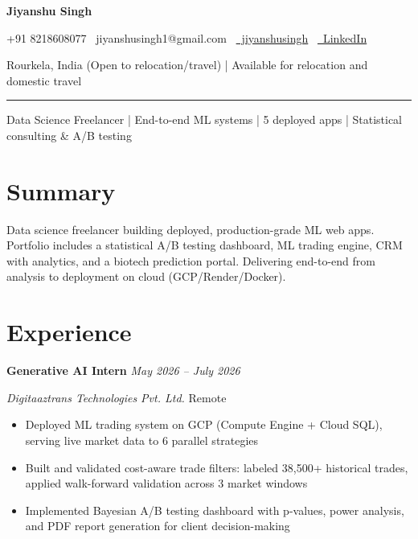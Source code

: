 \documentclass[11pt,a4paper]{article}
\begin{document}
\begin{center}
    {\LARGE \bfseries Jiyanshu Singh}
    
    \vspace{4pt}
    {\small +91 8218608077 \textbullet\ jiyanshusingh1@gmail.com \textbullet\ \href{https://github.com/jiyanshusingh}{\faGithub\ jiyanshusingh} \textbullet\ \href{https://linkedin.com/in/jiyanshusingh}{\faLinkedin\ LinkedIn}}
    
    \vspace{2pt}
    {\footnotesize Rourkela, India (Open to relocation/travel) | Available for relocation and domestic travel}
    
    \rule{\textwidth}{0.4pt}
\end{center}

\begin{center}
    {\large \color{midblue} Data Science Freelancer | End-to-end ML systems | 5 deployed apps | Statistical consulting \& A/B testing}
\end{center}

\vspace{6pt}
\section*{Summary}
Data science freelancer building deployed, production-grade ML web apps. Portfolio includes a statistical A/B testing dashboard, ML trading engine, CRM with analytics, and a biotech prediction portal. Delivering end-to-end from analysis to deployment on cloud (GCP/Render/Docker).

\section*{Experience}
\noindent\textbf{Generative AI Intern} \hfill \textit{May 2026 – July 2026}

\noindent\textit{Digitaaztrans Technologies Pvt. Ltd.} \hfill Remote
\begin{itemize}
    \item Deployed ML trading system on GCP (Compute Engine + Cloud SQL), serving live market data to 6 parallel strategies
    \item Built and validated cost-aware trade filters: labeled 38,500+ historical trades, applied walk-forward validation across 3 market windows
    \item Implemented Bayesian A/B testing dashboard with p-values, power analysis, and PDF report generation for client decision-making
\end{itemize}
\end{document}
